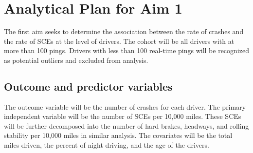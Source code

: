 \documentclass[12pt]{book}
\numberwithin{equation}{chapter}
\begin{document}
\begin{table}[H]

\caption{\label{tab:analysisshiftevent}SCEs data for hierarchical non-homogeneous Poisson process}
\centering
{}
\end{table}

\hypertarget{analytical-plan-for-aim-1}{%
\section{Analytical Plan for Aim 1}\label{analytical-plan-for-aim-1}}

The first aim seeks to determine the association between the rate of crashes and the rate of SCEs at the level of drivers. The cohort will be all drivers with at more than 100 pings. Drivers with less than 100 real-time pings will be recognized as potential outliers and excluded from analysis.

\hypertarget{outcome-and-predictor-variables}{%
\subsection{Outcome and predictor variables}\label{outcome-and-predictor-variables}}

The outcome variable will be the number of crashes for each driver. The primary independent variable will be the number of SCEs per 10,000 miles. These SCEs will be further decomposed into the number of hard brakes, headways, and rolling stability per 10,000 miles in similar analysis. The covariates will be the total miles driven, the percent of night driving, and the age of the drivers.
\end{document}
